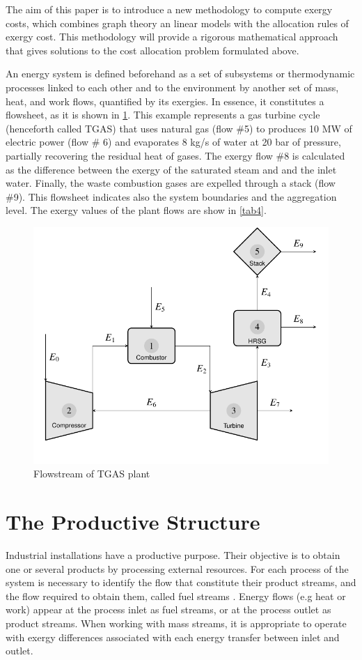 \documentclass{ecos2018}
\begin{document}
The aim of this paper is to introduce a new methodology to compute exergy costs, which combines graph theory an linear models with the allocation rules of exergy cost. This methodology will provide a rigorous mathematical approach that gives solutions to the cost allocation problem formulated above.

An energy system is defined beforehand as a set of subsystems or thermodynamic processes linked to each other and to the environment by another set of mass, heat, and work flows, quantified by its exergies. In essence, it constitutes a flowsheet, as it is shown in \cref{fig1}. This example represents a gas turbine cycle (henceforth called TGAS) that uses natural gas (flow \#5) to produces 10 MW of electric power (flow \# 6) and evaporates 8 kg/s of water at 20 bar of pressure, partially recovering the residual heat of gases. The exergy flow \#8 is calculated as the difference between the exergy of the saturated steam and and the inlet water. Finally, the waste combustion gases are expelled through a stack (flow \#9). This flowsheet indicates also the system boundaries and the aggregation level. The exergy values of the plant flows are show in \cref{tab4}.  

\begin{figure}[h]
	\centering
	\includegraphics[width=0.65\linewidth]{tgas.pdf}
	\caption{Flowstream of TGAS plant}
	\label{fig1}
\end{figure}

\section{The Productive Structure}
Industrial installations have a productive purpose. Their objective is to obtain one or several products by processing external resources. For each process of the system is necessary to identify the flow that constitute their product streams, and the flow  required to obtain them, called fuel streams \cite{Tsatsaronis1985,SPECO06}. Energy flows (e.g heat or work) appear at the process inlet as fuel streams, or at the process outlet as product streams. When working with mass streams, it is appropriate to operate with exergy differences associated with each energy transfer between inlet and outlet.
\end{document}
